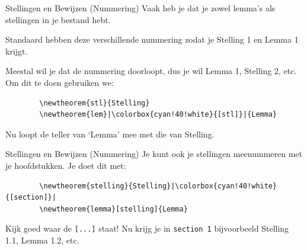 \begin{frame}[fragile]{Stellingen en Bewijzen (Nummering)}
    Vaak heb je dat je zowel lemma's als stellingen in je bestand hebt. \pause

    Standaard hebben deze verschillende nummering zodat je 
    Stelling 1 en Lemma 1 krijgt. \pause 

    Meestal wil je dat de nummering doorloopt, dus je wil Lemma 1, Stelling 2, etc. 
    Om dit te doen gebruiken we:
    \begin{verbatim}
        \newtheorem{stl}{Stelling}
        \newtheorem{lem}|\colorbox{cyan!40!white}{[stl]}|{Lemma}
    \end{verbatim}
    Nu loopt de teller van `Lemma' mee met die van Stelling. 
\end{frame}

\begin{frame}[fragile]{Stellingen en Bewijzen (Nummering)}
    Je kunt ook je stellingen meenummeren met je hoofdstukken. 
    \pause
    Je doet dit met:
    \begin{verbatim}
        \newtheorem{stelling}{Stelling}|\colorbox{cyan!40!white}{[section]}|
        \newtheorem{lemma}[stelling]{Lemma}
    \end{verbatim}
    Kijk goed waar de \texttt{[...]} staat!
    \pause
    Nu krijg je in \texttt{section 1} bijvoorbeeld Stelling 1.1, Lemma 1.2, etc. 
\end{frame}
